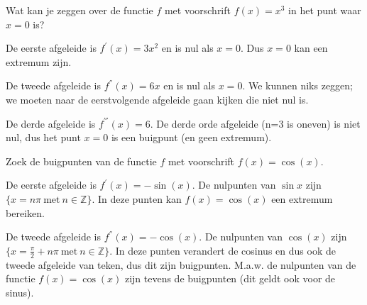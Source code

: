 \begin{voorbeeld}
	Wat kan je zeggen over de functie $f$ met voorschrift
$f(x)=x^{3}$ in het punt waar $x=0$ is?

De eerste afgeleide is $f^{'}(x)=3x^{2}$ en is nul als
$x=0$. Dus $x=0$ kan een extremum zijn.

De tweede afgeleide is $f^{''}(x)=6x$ en is nul als $x=0$.
We kunnen niks zeggen; we moeten naar de eerstvolgende afgeleide gaan
kijken die niet nul is.

De derde afgeleide is $f^{'''}(x)=6$. De derde orde afgeleide
(n=3 is oneven) is niet nul, dus het punt $x=0$ is een buigpunt (en
geen extremum).

\end{voorbeeld}

\begin{voorbeeld}
	Zoek de buigpunten van de functie $f$ met voorschrift
$f(x)=\cos(x)$.

De eerste afgeleide is $f^{'}(x)=-\sin(x)$. De nulpunten
van $\sin x$ zijn $\{x=n\pi\:\textrm{met}\:n\in\mathbb{Z}\}$. In
deze punten kan $f(x)=\cos(x)$ een extremum bereiken.

De tweede afgeleide is $f^{''}(x)=-\cos(x)$. De nulpunten
van $\cos(x)$ zijn $\{x=\frac{\pi}{2}+n\pi\:\textrm{met}\:n\in\mathbb{Z}\}$.
In deze punten verandert de cosinus en dus ook de tweede afgeleide
van teken, dus dit zijn buigpunten. M.a.w. de nulpunten van de functie
$f(x)=\cos(x)$ zijn tevens de buigpunten (dit geldt ook voor de sinus).

\end{voorbeeld}